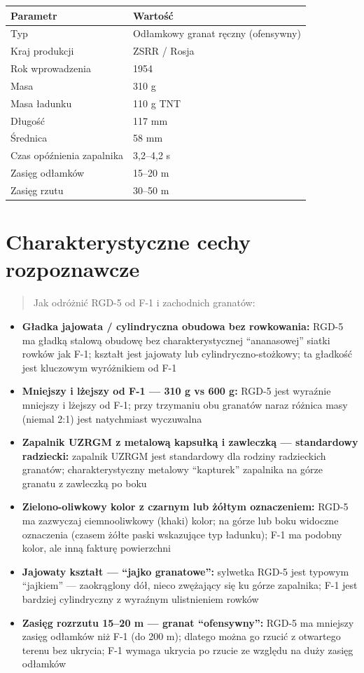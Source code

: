 \documentclass[12pt,openany,oneside]{book}
\providecommand{\tightlist}{%
  \setlength{\itemsep}{0pt}\setlength{\parskip}{0pt}}
\begin{document}
\begin{longtable}[]{@{}ll@{}}
\toprule\noalign{}
Parametr & Wartość \\
\midrule\noalign{}
\endhead
\bottomrule\noalign{}
\endlastfoot
Typ & Odłamkowy granat ręczny (ofensywny) \\
Kraj produkcji & ZSRR / Rosja \\
Rok wprowadzenia & 1954 \\
Masa & 310 g \\
Masa ładunku & 110 g TNT \\
Długość & 117 mm \\
Średnica & 58 mm \\
Czas opóźnienia zapalnika & 3,2--4,2 s \\
Zasięg odłamków & 15--20 m \\
Zasięg rzutu & 30--50 m \\
\end{longtable}

\section{Charakterystyczne cechy
rozpoznawcze}\label{charakterystyczne-cechy-rozpoznawcze-102}

\begin{quote}
Jak odróżnić RGD-5 od F-1 i zachodnich granatów:
\end{quote}

\begin{itemize}
\tightlist
\item
  \textbf{Gładka jajowata / cylindryczna obudowa bez rowkowania:} RGD-5
  ma gładką stalową obudowę bez charakterystycznej ``ananasowej'' siatki
  rowków jak F-1; kształt jest jajowaty lub cylindryczno-stożkowy; ta
  gładkość jest kluczowym wyróżnikiem od F-1
\item
  \textbf{Mniejszy i lżejszy od F-1 --- 310 g vs 600 g:} RGD-5 jest
  wyraźnie mniejszy i lżejszy od F-1; przy trzymaniu obu granatów naraz
  różnica masy (niemal 2:1) jest natychmiast wyczuwalna
\item
  \textbf{Zapalnik UZRGM z metalową kapsułką i zawleczką --- standardowy
  radziecki:} zapalnik UZRGM jest standardowy dla rodziny radzieckich
  granatów; charakterystyczny metalowy ``kapturek'' zapalnika na górze
  granatu z zawleczką po boku
\item
  \textbf{Zielono-oliwkowy kolor z czarnym lub żółtym oznaczeniem:}
  RGD-5 ma zazwyczaj ciemnooliwkowy (khaki) kolor; na górze lub boku
  widoczne oznaczenia (czasem żółte paski wskazujące typ ładunku); F-1
  ma podobny kolor, ale inną fakturę powierzchni
\item
  \textbf{Jajowaty kształt --- ``jajko granatowe'':} sylwetka RGD-5 jest
  typowym ``jajkiem'' --- zaokrąglony dół, nieco zwężający się ku górze
  zapalnika; F-1 jest bardziej cylindryczny z wyraźnym ulistnieniem
  rowków
\item
  \textbf{Zasięg rozrzutu 15--20 m --- granat ``ofensywny'':} RGD-5 ma
  mniejszy zasięg odłamków niż F-1 (do 200 m); dlatego można go rzucić z
  otwartego terenu bez ukrycia; F-1 wymaga ukrycia po rzucie ze względu
  na duży zasięg odłamków
\end{itemize}
\end{document}
